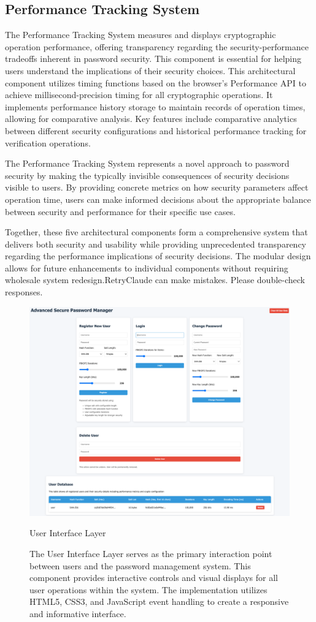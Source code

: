 \documentclass[11pt,a4paper]{article}
\begin{document}
\subsection{Performance Tracking System}
The Performance Tracking System measures and displays cryptographic operation performance, offering transparency regarding the security-performance tradeoffs inherent in password security. This component is essential for helping users understand the implications of their security choices.
This architectural component utilizes timing functions based on the browser's Performance API to achieve millisecond-precision timing for all cryptographic operations. It implements performance history storage to maintain records of operation times, allowing for comparative analysis. Key features include comparative analytics between different security configurations and historical performance tracking for verification operations.

The Performance Tracking System represents a novel approach to password security by making the typically invisible consequences of security decisions visible to users. By providing concrete metrics on how security parameters affect operation time, users can make informed decisions about the appropriate balance between security and performance for their specific use cases.

Together, these five architectural components form a comprehensive system that delivers both security and usability while providing unprecedented transparency regarding the performance implications of security decisions. The modular design allows for future enhancements to individual components without requiring wholesale system redesign.RetryClaude can make mistakes. Please double-check responses.
\begin{figure}
\centering
\includegraphics[width=1\linewidth]{images/UI.png}
\caption{User Interface Layer}
\caption*{The User Interface Layer serves as the primary interaction point between users and the password management system. This component provides interactive controls and visual displays for all user operations within the system. The implementation utilizes HTML5, CSS3, and JavaScript event handling to create a responsive and informative interface.}
\label{UI}
\end{figure}
\end{document}
